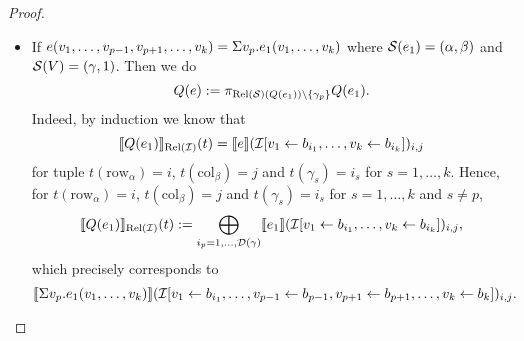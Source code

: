 \begin{proof}
\begin{itemize}
  \item If $e(v_1,\ldots,v_{p-1},v_{p+1},\ldots,v_k)=\Sigma v_p. e_1(v_1,\ldots,v_k)$ where $\mathcal{S}(e_1)=(\alpha,\beta)$ and $\mathcal{S}(V)=(\gamma,1)$. Then we do 
  $$
  Q (e):=\pi_{\text{Rel}(\mathcal{S})(Q(e_1))\setminus\{\gamma_p\}} Q (e_1).
  $$
 Indeed, by induction we know that 
 $$
\llbracket Q(e_1) \rrbracket_{\text{Rel}(\mathcal{I})}(t)=\llbracket e \rrbracket(\mathcal{I}[v_1\gets b_{i_1},\ldots,v_k\gets b_{i_k}])_{i,j}
$$
for tuple $t(\mathrm{row}_\alpha)=i$, $t(\mathrm{col}_\beta)=j$ and $t(\gamma_s)=i_s$ for $s=1,\ldots, k$.
Hence, for $t(\mathrm{row}_\alpha)=i$, $t(\mathrm{col}_\beta)=j$ and $t(\gamma_s)=i_s$ for $s=1,\ldots, k$ and $s\neq p$,
$$
\llbracket Q(e_1) \rrbracket_{\text{Rel}(\mathcal{I})}(t):=\bigoplus_{i_p=1,\ldots,\mathcal{D}(\gamma)} \llbracket e_1 \rrbracket(\mathcal{I}[v_1\gets b_{i_1},\ldots,v_k\gets b_{i_k}])_{i,j},$$
which precisely corresponds to 
$$
\llbracket \Sigma v_p. e_1(v_1,\ldots,v_k) \rrbracket(\mathcal{I}[v_1\gets b_{i_1},\ldots,v_{p-1}\gets b_{p-1},v_{p+1}\gets b_{p+1},\ldots,v_k\gets b_k])_{i,j}.
$$
 

\end{itemize}
\end{proof}
